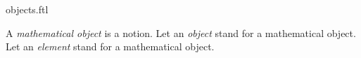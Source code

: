 \documentclass{stex}
\begin{document}
\begin{smodule}{objects.ftl}


\begin{fakeforthel}
  \begin{signature}[for={object,element}]
    A \emph{mathematical object} is a notion.
    Let an \emph{object} stand for a mathematical object.
    Let an \emph{element} stand for a mathematical object.
  \end{signature}
\end{fakeforthel}

\end{smodule}
\end{document}
